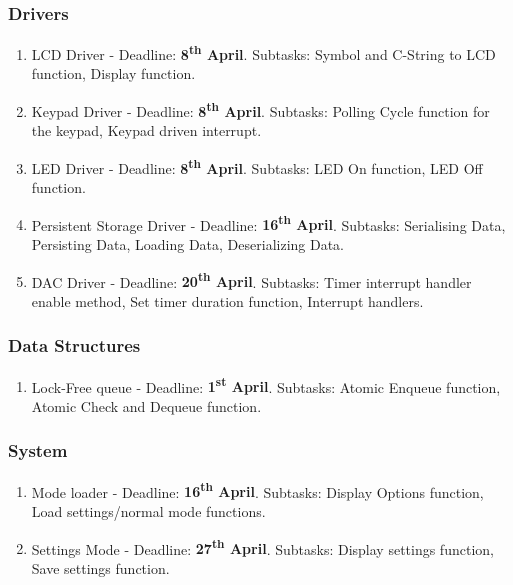 \documentclass[11pt,a4paper,twocolumn]{scrartcl}
\begin{document}
\subsubsection{Drivers}
\begin{enumerate}
    \item LCD Driver - Deadline: \textbf{8\textsuperscript{th} April}. Subtasks: Symbol and C-String to LCD function, Display function.
    \item Keypad Driver - Deadline: \textbf{8\textsuperscript{th} April}. Subtasks: Polling Cycle function for the keypad, Keypad driven interrupt.
    \item LED Driver - Deadline: \textbf{8\textsuperscript{th} April}. Subtasks: LED On function, LED Off function.
    \item Persistent Storage Driver - Deadline: \textbf{16\textsuperscript{th} April}. Subtasks: Serialising Data, Persisting Data, Loading Data, Deserializing Data.
    \item DAC Driver - Deadline: \textbf{20\textsuperscript{th} April}. Subtasks: Timer interrupt handler enable method, Set timer duration function, Interrupt handlers.
\end{enumerate}

\subsubsection{Data Structures}
\begin{enumerate}
    \item Lock-Free queue - Deadline: \textbf{1\textsuperscript{st} April}. Subtasks: Atomic Enqueue function, Atomic Check and Dequeue function.
\end{enumerate}

\subsubsection{System}
\begin{enumerate}
    \item Mode loader - Deadline: \textbf{16\textsuperscript{th} April}. Subtasks: Display Options function, Load settings/normal mode functions.
    \item Settings Mode - Deadline: \textbf{27\textsuperscript{th} April}. Subtasks: Display settings function, Save settings function.
\end{enumerate}
\end{document}
